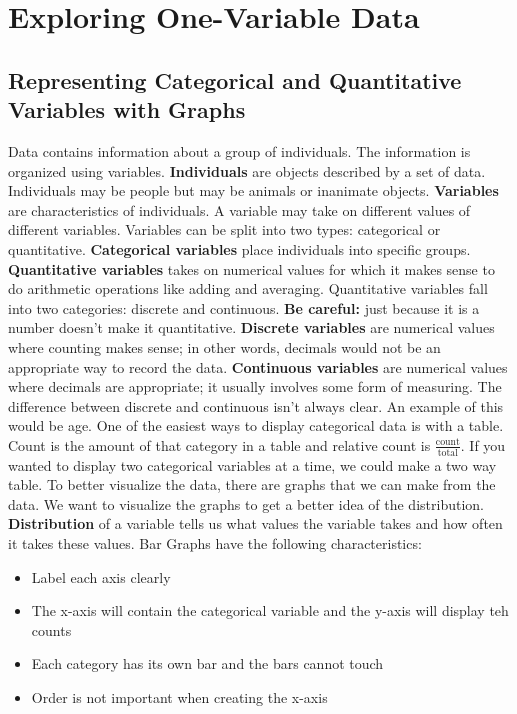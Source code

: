 \documentclass[../stats.tex]{subfiles}
\begin{document}
\chapter{Exploring One-Variable Data}
\section{Representing Categorical and Quantitative Variables with Graphs}
Data contains information about a group of individuals. The information is organized using variables.
\smallbreak
\textbf{Individuals} are objects described by a set of data. Individuals may be people but may be animals or inanimate objects.
\smallbreak
\textbf{Variables} are characteristics of individuals. A variable may take on different values of different variables. Variables can be split into two types: categorical or quantitative.
\smallbreak
\textbf{Categorical variables} place individuals into specific groups.
\smallbreak
\textbf{Quantitative variables} takes on numerical values for which it makes sense to do arithmetic operations like adding and averaging. Quantitative variables fall into two categories: discrete and continuous.
\smallbreak
\textbf{Be careful: } just because it is a number doesn't make it quantitative.
\smallbreak
\textbf{Discrete variables} are numerical values where counting makes sense; in other words, decimals would not be an appropriate way to record the data.
\smallbreak
\textbf{Continuous variables} are numerical values where decimals are appropriate; it usually involves some form of measuring.
\smallbreak
The difference between discrete and continuous isn't always clear. An example of this would be age.
\medbreak
One of the easiest ways to display categorical data is with a table.
\smallbreak
Count is the amount of that category in a table and relative count is $\frac{\text{count}}{\text{total}}$.
\smallbreak
If you wanted to display two categorical variables at a time, we could make a two way table.
\smallbreak
To better visualize the data, there are graphs that we can make from the data. We want to visualize the graphs to get a better idea of the distribution.
\smallbreak
\textbf{Distribution} of a variable tells us what values the variable takes and how often it takes these values.
\smallbreak
Bar Graphs have the following characteristics:
\begin{itemize}
    \item Label each axis clearly
    \item The x-axis will contain the categorical variable and the y-axis will display teh counts
    \item Each category has its own bar and the bars cannot touch
    \item Order is not important when creating the x-axis
\end{itemize}
\end{document}
